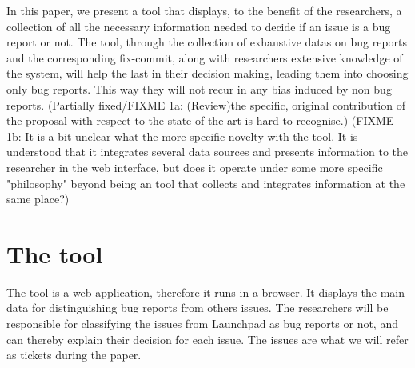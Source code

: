 \documentclass[runningheads,a4paper]{llncs}
\begin{document}
In this paper, we present a tool that displays, to the benefit of the researchers, a collection of all the necessary information needed to decide if an issue is a bug report or not. The tool, through the collection of exhaustive datas on bug reports and the corresponding fix-commit, along with researchers extensive knowledge of the system, will help the last in their decision making, leading them into choosing only bug reports. This way they will not recur in any bias induced by non bug reports. (Partially fixed/FIXME 1a: (Review)the specific, original contribution of the proposal with respect to the state of the art is hard to recognise.)%
(FIXME 1b:  It is a bit unclear what the more specific novelty with the tool. It is understood that it integrates several data sources and presents information to the researcher in the web interface, but does it operate under some more specific "philosophy" beyond being an tool that collects and integrates information at the same place?)

\section{The tool}
\label{sec:2}

The tool is a web application, therefore it runs in a browser. It displays the main data for distinguishing bug reports from others issues. The researchers will be responsible for classifying the issues from Launchpad as bug reports or not, and can thereby explain their decision for each issue. The issues are what we will refer as tickets during the paper.
\end{document}
